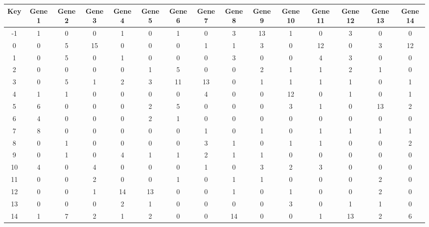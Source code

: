 \begin{tabular}{|c|c|c|c|c|c|c|c|c|c|c|c|c|c|c|}
\hline
Key & Gene 1 & Gene 2 & Gene 3 & Gene 4 & Gene 5 & Gene 6 & Gene 7 & Gene 8 & Gene 9 & Gene 10 & Gene 11 & Gene 12 & Gene 13 & Gene 14 \\
\hline
-1 & 1 & 0 & 0 & 1 & 0 & 1 & 0 & 3 & 13 & 1 & 0 & 3 & 0 & 0 \\
0 & 0 & 5 & 15 & 0 & 0 & 0 & 1 & 1 & 3 & 0 & 12 & 0 & 3 & 12 \\
1 & 0 & 5 & 0 & 1 & 0 & 0 & 0 & 3 & 0 & 0 & 4 & 3 & 0 & 0 \\
2 & 0 & 0 & 0 & 0 & 1 & 5 & 0 & 0 & 2 & 1 & 1 & 2 & 1 & 0 \\
3 & 0 & 5 & 1 & 2 & 3 & 11 & 13 & 0 & 1 & 1 & 1 & 1 & 0 & 1 \\
4 & 1 & 1 & 0 & 0 & 0 & 0 & 4 & 0 & 0 & 12 & 0 & 1 & 0 & 1 \\
5 & 6 & 0 & 0 & 0 & 2 & 5 & 0 & 0 & 0 & 3 & 1 & 0 & 13 & 2 \\
6 & 4 & 0 & 0 & 0 & 2 & 1 & 0 & 0 & 0 & 0 & 0 & 0 & 0 & 0 \\
7 & 8 & 0 & 0 & 0 & 0 & 0 & 1 & 0 & 1 & 0 & 1 & 1 & 1 & 1 \\
8 & 0 & 1 & 0 & 0 & 0 & 0 & 3 & 1 & 0 & 1 & 1 & 0 & 0 & 2 \\
9 & 0 & 1 & 0 & 4 & 1 & 1 & 2 & 1 & 1 & 0 & 0 & 0 & 0 & 0 \\
10 & 4 & 0 & 4 & 0 & 0 & 0 & 1 & 0 & 3 & 2 & 3 & 0 & 0 & 0 \\
11 & 0 & 0 & 2 & 0 & 0 & 1 & 0 & 1 & 1 & 0 & 0 & 0 & 2 & 0 \\
12 & 0 & 0 & 1 & 14 & 13 & 0 & 0 & 1 & 0 & 1 & 0 & 0 & 2 & 0 \\
13 & 0 & 0 & 0 & 2 & 1 & 0 & 0 & 0 & 0 & 3 & 0 & 1 & 1 & 0 \\
14 & 1 & 7 & 2 & 1 & 2 & 0 & 0 & 14 & 0 & 0 & 1 & 13 & 2 & 6 \\
\hline
\end{tabular}